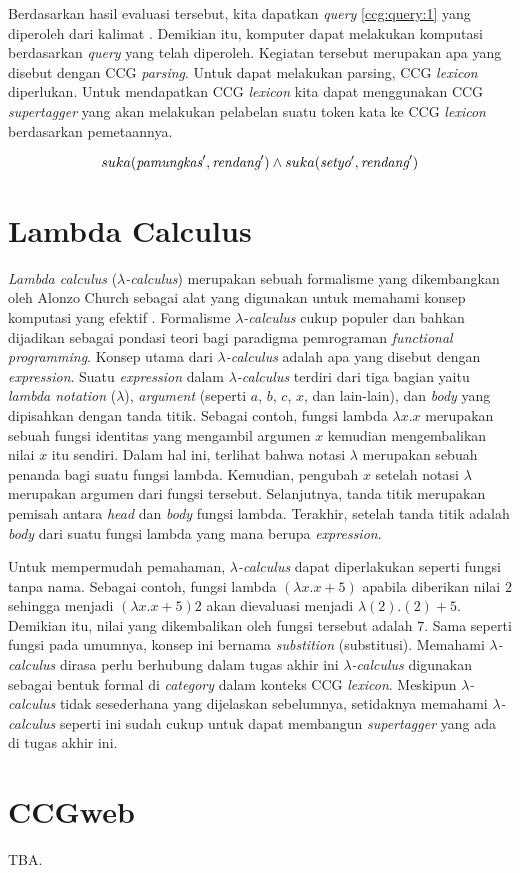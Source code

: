 Berdasarkan hasil evaluasi tersebut, kita dapatkan \textit{query} \ref{ccg:query:1}
yang diperoleh dari kalimat .
Demikian itu, komputer dapat melakukan komputasi berdasarkan \textit{query} yang telah diperoleh.
Kegiatan tersebut merupakan apa yang disebut dengan CCG \textit{parsing}.
Untuk dapat melakukan parsing, CCG \textit{lexicon} diperlukan.
Untuk mendapatkan CCG \textit{lexicon} kita dapat menggunakan CCG \textit{supertagger}
yang akan melakukan pelabelan suatu token kata ke CCG \textit{lexicon} berdasarkan
pemetaannya.

\begin{equation}\label{ccg:query:1}
  suka(\mbox{\it pamungkas}^\prime, \mbox{\it rendang}^\prime) \land suka(\mbox{\it setyo}^\prime, \mbox{\it rendang}^\prime)
\end{equation}


\section{Lambda Calculus}
\textit{Lambda calculus} ({$\lambda$}\textit{-calculus}) merupakan sebuah formalisme yang dikembangkan
oleh Alonzo Church sebagai alat yang digunakan untuk memahami konsep komputasi yang efektif
\cite{DBLP:journals/corr/Rojas15}.
Formalisme {$\lambda$}\textit{-calculus} cukup populer dan bahkan dijadikan sebagai pondasi teori bagi
paradigma pemrograman \textit{functional programming}.
Konsep utama dari {$\lambda$}\textit{-calculus} adalah apa yang disebut dengan \textit{expression}.
Suatu \textit{expression} dalam {$\lambda$}\textit{-calculus} terdiri dari tiga bagian yaitu
\textit{lambda notation} ({$\lambda$}), \textit{argument} (seperti $a$, $b$, $c$, $x$, dan lain-lain),
dan \textit{body} yang dipisahkan dengan tanda titik.
Sebagai contoh, fungsi lambda ${\lambda}x. x$ merupakan sebuah fungsi identitas yang mengambil
argumen $x$ kemudian mengembalikan nilai $x$ itu sendiri.
Dalam hal ini, terlihat bahwa notasi {$\lambda$} merupakan sebuah penanda bagi suatu fungsi lambda.
Kemudian, pengubah $x$ setelah notasi {$\lambda$} merupakan argumen dari fungsi tersebut.
Selanjutnya, tanda titik merupakan pemisah antara \textit{head} dan \textit{body} fungsi lambda.
Terakhir, setelah tanda titik adalah \textit{body} dari suatu fungsi lambda yang mana berupa
\textit{expression}.

Untuk mempermudah pemahaman, {$\lambda$}\textit{-calculus} dapat diperlakukan seperti fungsi tanpa
nama. Sebagai contoh, fungsi lambda $({\lambda}x. x + 5)$ apabila diberikan nilai $2$ sehingga
menjadi $({\lambda}x. x + 5) 2$ akan dievaluasi menjadi ${\lambda}(2). (2) + 5$.
Demikian itu, nilai yang dikembalikan oleh fungsi tersebut adalah $7$.
Sama seperti fungsi pada umumnya, konsep ini bernama \textit{substition} (substitusi).
Memahami {$\lambda$}\textit{-calculus} dirasa perlu berhubung dalam tugas akhir ini
{$\lambda$}\textit{-calculus} digunakan sebagai bentuk formal di \textit{category}
dalam konteks CCG \textit{lexicon}. Meskipun {$\lambda$}\textit{-calculus} tidak sesederhana
yang dijelaskan sebelumnya, setidaknya memahami {$\lambda$}\textit{-calculus} seperti ini
sudah cukup untuk dapat membangun \textit{supertagger} yang ada di tugas akhir ini.


\section{CCGweb}
TBA.

